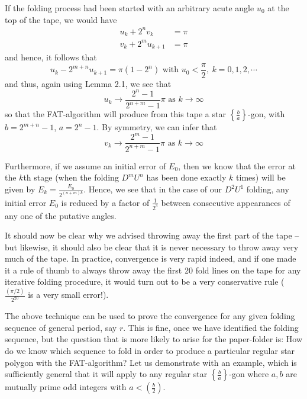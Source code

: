 If the folding process had been started with an arbitrary acute angle $u_{0}$ at the top of the tape, we would have
\begin{align*}
u_{k} + 2^{n} v_{k} & = \pi \\
v_{k} + 2^{m} u_{k+1} & = \pi
\end{align*}
and hence, it follows that
\begin{equation}
u_{k} - 2^{m+n} u_{k+1} = \pi (1 - 2^{n}) \text{ with } u_{0} < \frac{\pi}{2},\ k = 0,1,2,\cdots  \tag{2.4}
\end{equation}
and thus, again using Lemma 2.1, we see that
\begin{equation}
u_{k} \to \frac{2^{n}-1}{2^{n+m}-1} \pi \text{ as } k \to \infty  \tag{2.5}
\end{equation}
so that the FAT-algorithm will produce from this tape a star $\left\{ \frac{b}{a} \right\}$-gon, with $b = 2^{m+n}-1$, $a = 2^{n}-1$. By symmetry, we can infer that
\begin{equation}
v_{k} \to \frac{2^{m}-1}{2^{n+m}-1} \pi \text{ as } k \to \infty  \tag{2.6}
\end{equation}

Furthermore, if we assume an initial error of $E_{0}$, then we know that the error at the $k$th stage (when the folding $D^{m} U^{n}$ has been done exactly $k$ times) will be given by $E_{k} = \frac{E_{0}}{2^{(n+m)k}}$. Hence, we see that in the case of our $D^{2} U^{1}$ folding, any initial error $E_{0}$ is reduced by a factor of $\frac{1}{2^{3}}$ between consecutive appearances of any one of the putative angles.

It should now be clear why we advised throwing away the first part of the tape -- but likewise, it should also be clear that it is never necessary to throw away very much of the tape. In practice, convergence is very rapid indeed, and if one made it a rule of thumb to always throw away the first 20 fold lines on the tape for any iterative folding procedure, it would turn out to be a very conservative rule ($\frac{(\pi/2)}{2^{20}}$ is a very small error!).

The above technique can be used to prove the convergence for any given folding sequence of general period, say $r$. This is fine, once we have identified the folding sequence, but the question that is more likely to arise for the paper-folder is: How do we know which sequence to fold in order to produce a particular regular star polygon with the FAT-algorithm? Let us demonstrate with an example, which is sufficiently general that it will apply to any regular star $\left\{ \frac{b}{a} \right\}$-gon where $a,b$ are mutually prime odd integers with $a < \left( \frac{b}{2} \right)$.

